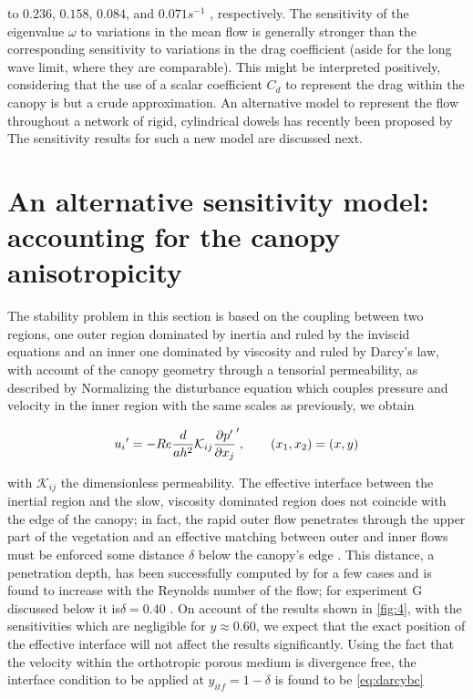 to $0.236$, $0.158$, $0.084$, and $0.071 s^{-1}$ , respectively. The sensitivity of the eigenvalue $\omega$ to variations
in the mean flow is generally stronger than the corresponding sensitivity to variations in the drag
coefficient (aside for the long wave limit, where they are comparable). This might be interpreted
positively, considering that the use of a scalar coefficient $C_d$ to represent the drag within the canopy
is but a crude approximation. An alternative model to represent the flow throughout a network of
rigid, cylindrical dowels has recently been proposed by \citet{zampogna2016instability} The sensitivity results for
such a new model are discussed next.


\section{An alternative sensitivity model: accounting for the canopy anisotropicity}
\label{sec:4}

The stability problem in this section is based on the coupling between two regions, one outer
region dominated by inertia and ruled by the inviscid equations and an inner one dominated by
viscosity and ruled by Darcy’s law, with account of the canopy geometry through a tensorial
permeability, as described by \citet{zampogna2016instability} Normalizing the disturbance equation which couples
pressure and velocity in the inner region with the same scales as previously, we obtain

\begin{equation}
{u_i}' = -Re \dfrac{d}{ah^2} \mathcal{K}_{ij} \dfrac{\partial p'}{\partial {}x_j}',  \qquad (x_1, x_2) = (x,y)
\label{eq:darcy}
\end{equation}


with $\mathcal{K}_{ij}$ the dimensionless permeability. The effective interface between the inertial region and the
slow, viscosity dominated region does not coincide with the edge of the canopy; in fact, the rapid
outer flow penetrates through the upper part of the vegetation and an effective matching between
outer and inner flows must be enforced some distance $\delta$ below the canopy’s edge \citet{le2006interfacial}.  This distance,
a penetration depth, has been successfully computed by \citet{zampogna2016fluid} for a few cases
and is found to increase with the Reynolds number of the flow; for experiment G discussed below it
is$ \delta = 0.40$ \citet{zampognaprivate}. On account of the results shown in \ref{fig:4}, with the sensitivities which are negligible
for $y \approx 0.60$, we expect that the exact position of the effective interface will not affect the results
significantly.
Using the fact that the velocity within the orthotropic porous medium is divergence free, the
interface condition to be applied at $y_{itf} = 1 - \delta$ is found to be \ref{eq:darcybc}

